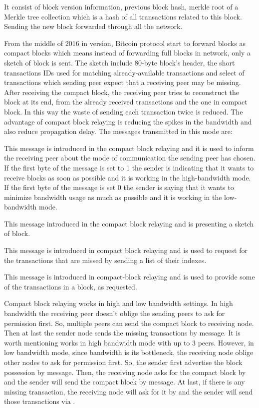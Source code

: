  It consist of block version information, previous block hash, merkle root of a Merkle tree collection which is a hash of all transactions related to this block. Sending  the new block forwarded through all the network.

From the middle of 2016 in  version, Bitcoin protocol start to forward blocks as compact blocks which means instead of forwarding full blocks in network, only a sketch of block is sent. The sketch include 80-byte block's header, the short transactions IDs used for matching already-available transactions and select of transactions which sending peer expect that a receiving peer may be missing. After receiving the compact block, the receiving peer tries to reconstruct the block at its end, from the already received transactions and the one in compact block. In this way the waste of sending each transaction twice is reduced. The advantage of compact block relaying is reducing the spikes in the bandwidth and  also reduce propagation delay. The messages transmitted in this mode are: 

 This message is introduced in the compact block relaying and it is used to inform the receiving peer about the mode of communication the sending peer has chosen. If the first byte of the message is set to 1 the sender is indicating that it wants to receive blocks as soon as possible and it is working in the high-bandwidth mode. If the first byte of the message is set 0 the sender is saying that it wants to minimize bandwidth usage as much as possible and it is working in the low-bandwidth mode.

 This message introduced in the compact block relaying and is presenting a sketch of block.

 This message is introduced in compact block relaying and is used to request for the transactions that are missed by sending a list of their indexes. 

 This message is introduced in compact-block relaying and is used to provide some of the transactions in a block, as requested.


Compact block relaying works in high and low bandwidth settings. In high bandwidth the receiving peer doesn't oblige the sending peers to ask for permission first. So, multiple peers can send the compact block to receiving node. Then at last the sender node sends the missing transactions by  message. It is worth mentioning \bc works in high bandwidth mode with up to 3 peers. 
However, in low bandwidth mode, since bandwidth is its bottleneck, the receiving node oblige other nodes to ask for permission first. So, the sender first advertise the block possession by  message. Then, the receiving node asks for the compact block by  and the sender will send the compact block by  message. At last, if there is any missing transaction, the receiving node will ask for it by  and the sender will send those transactions via . 


